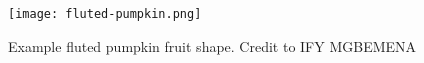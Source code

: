 \begin{figure}[h]
	\centering 
	\texttt{[image: fluted-pumpkin.png]}
	\caption{\label{fig:ike_ugu} Example fluted pumpkin fruit shape. Credit to IFY MGBEMENA}
\end{figure}